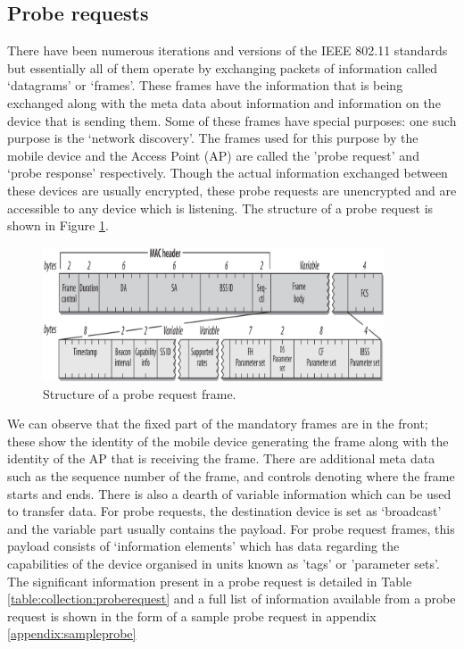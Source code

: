 \subsection{Probe requests}

There have been numerous iterations and versions of the IEEE 802.11 standards but essentially all of them operate by exchanging packets of information called `datagrams' or `frames'.
These frames have the information that is being exchanged along with the meta data about information and information on the device that is sending them.
Some of these frames have special purposes: one such purpose is the `network discovery'.
The frames used for this purpose by the mobile device and the Access Point (AP) are called the 'probe request' and `probe response' respectively.
Though the actual information exchanged between these devices are usually encrypted, these probe requests are unencrypted and are accessible to any device which is listening.
The structure of a probe request is shown in Figure \ref{figure:collection:proberequest}.

\begin{figure}
  \includegraphics[width=0.9\textwidth,trim={0 -30 0 -10},clip]{images/probe-request-structure.png}
  \caption{Structure of a probe request frame. }
  \label{figure:collection:proberequest}
\end{figure}

We can observe that the fixed part of the mandatory frames are in the front; these show the identity of the mobile device generating the frame along with the identity of the AP that is receiving the frame.
There are additional meta data such as the sequence number of the frame, and controls denoting where the frame starts and ends.
There is also a dearth of variable information which can be used to transfer data.
For probe requests, the destination device is set as `broadcast' and the variable part usually contains the payload.
For probe request frames, this payload consists of `information elements' which has data regarding the capabilities of the device organised in units known as 'tags' or 'parameter sets'.
The significant information present in a probe request is detailed in Table \ref{table:collection:proberequest} and a full list of information available from a probe request is shown in the form of a sample probe request in appendix \ref{appendix:sampleprobe}

